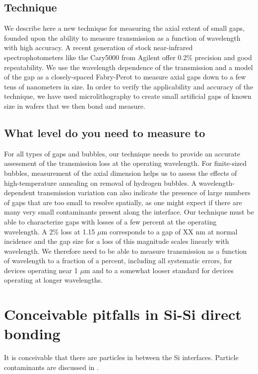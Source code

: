 \documentclass[osajnl,preprint,showpacs,superscriptaddress,12pt]{revtex4-1} %
\begin{document}
\subsection{Technique}
We describe here a new technique for measuring the axial extent of small gaps, founded upon the ability to measure transmission as a function of wavelength with high accuracy.   A recent generation of stock near-infrared spectrophotometers like the Cary5000 from Agilent offer 0.2\% precision and good repeatability.  We use the wavelength dependence of the transmission and a model of the gap as a closely-spaced Fabry-Perot to measure axial gaps down to a few tens of nanometers in size.  In order to verify the applicability and accuracy of the technique, we have used microlithography to create small artificial gaps of known size in wafers that we then bond and measure.

\subsection{What level do you need to measure to}
For all types of gaps and bubbles, our technique needs to provide an accurate assessment of the transmission loss at the operating wavelength.  For finite-sized bubbles, measurement of the axial dimension helps us to assess the effects of high-temperature annealing \cite{Horn2009, Masteika2014} on removal of hydrogen bubbles.  A wavelength-dependent transmission variation can also indicate the presence of large numbers of gaps that are too small to resolve spatially, as one might expect if there are many very small contaminants present along the interface.  Our technique must be able to characterize gaps with losses of a few percent at the operating wavelength.  A 2\% loss at 1.15 $\mu$m corresponds to a gap of XX nm at normal incidence and the gap size for a loss of this magnitude scales linearly with wavelength.  We therefore need to be able to measure transmission as a function of wavelength to a fraction of a percent, including all systematic errors, for devices operating near 1 $\mu$m and to a somewhat looser standard for devices operating at longer wavelengths. 

\section{Conceivable pitfalls in Si-Si direct bonding}

It is conceivable that there are particles in between the Si interfaces.  Particle contaminants are discussed in \cite{Mitani1990}.
\end{document}
